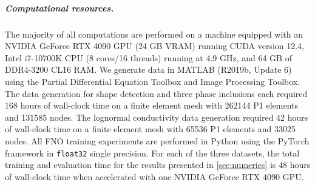 \documentclass[pdflatex,sn-mathphys-num]{sn-jnl-preprint}
\theoremstyle{thmstyleone}%
\theoremstyle{thmstyletwo}%
\theoremstyle{thmstylethree}%
\numberwithin{equation}{section}
\numberwithin{theorem}{section}
\begin{document}
\begin{appendices}
\subparagraph*{\emph{\textbf{Computational resources.}}}
The majority of all computations are performed on a machine equipped with an NVIDIA GeForce RTX 4090 GPU (24 GB VRAM) running CUDA version 12.4, Intel i7-10700K CPU (8 cores/16 threads) running at 4.9 GHz, and 64 GB of DDR4-3200 CL16 RAM. 
We generate data in MATLAB (R2019b, Update 6) using the Partial Differential Equation Toolbox and Image Processing Toolbox.
The data generation for shape detection and three phase inclusions each required 168 hours of wall-clock time on a finite element mesh with 262144 P1 elements and 131585 nodes. The lognormal conductivity data generation required 42 hours of wall-clock time on a finite element mesh with 65536 P1 elements and 33025 nodes.
All FNO training experiments are performed in Python using the PyTorch framework in \texttt{float32} single precision.
For each of the three datasets, the total training and evaluation time for the results presented in \cref{sec:numerics} is 48 hours of wall-clock time when accelerated with one NVIDIA GeForce RTX 4090 GPU.


\end{appendices}



\end{document}

